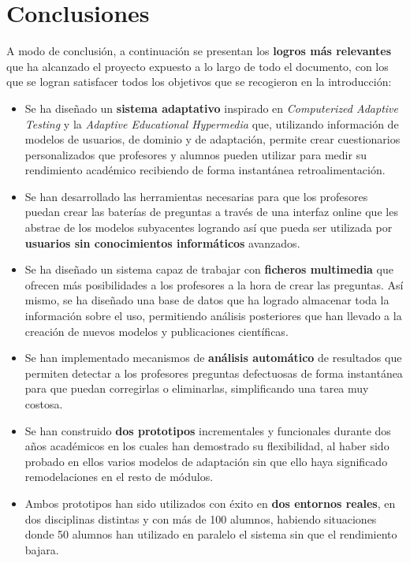 \chapter{Conclusiones\label{sec:conclusiones}}

A modo de conclusión, a continuación se presentan los \textbf{logros más relevantes} que ha alcanzado el proyecto expuesto a lo largo de todo el documento, con los que se logran satisfacer todos los objetivos que se recogieron en la introducción:

\begin{itemize}
	\item Se ha diseñado un \textbf{sistema adaptativo} inspirado en \textit{Computerized Adaptive Testing} y la \textit{Adaptive Educational Hypermedia} que, utilizando información de modelos de usuarios, de dominio y de adaptación, permite crear cuestionarios personalizados que profesores y alumnos pueden utilizar para medir su rendimiento académico recibiendo de forma instantánea retroalimentación.
	\item Se han desarrollado las herramientas necesarias para que los profesores puedan crear las baterías de preguntas a través de una interfaz online que les abstrae de los modelos subyacentes logrando así que pueda ser utilizada por \textbf{usuarios sin conocimientos informáticos} avanzados.
	\item Se ha diseñado un sistema capaz de trabajar con \textbf{ficheros multimedia} que ofrecen más posibilidades a los profesores a la hora de crear las preguntas. Así mismo, se ha diseñado una base de datos que ha logrado almacenar toda la información sobre el uso, permitiendo análisis posteriores que han llevado a la creación de nuevos modelos y publicaciones científicas.
	\item Se han implementado mecanismos de \textbf{análisis automático} de resultados que permiten detectar a los profesores preguntas defectuosas de forma instantánea para que puedan corregirlas o eliminarlas, simplificando una tarea muy costosa.
	\item Se han construido \textbf{dos prototipos} incrementales y funcionales durante dos años académicos en los cuales han demostrado su flexibilidad, al haber sido probado en ellos varios modelos de adaptación sin que ello haya significado remodelaciones en el resto de módulos.
	\item Ambos prototipos han sido utilizados con éxito en\textbf{ dos entornos reales}, en dos disciplinas distintas y con más de 100 alumnos, habiendo situaciones donde 50 alumnos han utilizado en paralelo el sistema sin que el rendimiento bajara.
\end{itemize}

